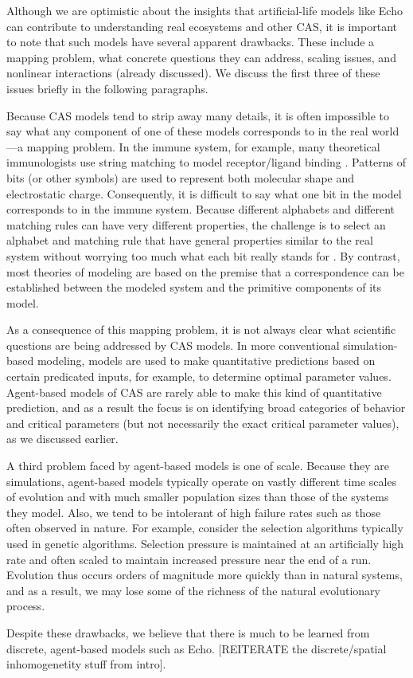 Although we are optimistic about the insights that artificial-life
models like Echo can contribute to understanding real ecosystems and
other CAS, it is important to note that such models have several
apparent drawbacks.  These include a mapping problem, what concrete
questions they can address, scaling issues, and nonlinear interactions
(already discussed).  We discuss the first three of these issues
briefly in the following paragraphs.

Because CAS models tend to strip away many details, it is often
impossible to say what any component of one of these models
corresponds to in the real world---a mapping problem.  In
the immune system, for example, many theoretical immunologists use string
matching to model receptor/ligand binding
\cite{PerelsonAndOster79}.  Patterns of bits (or other symbols) are
used to represent both molecular shape and electrostatic charge.
Consequently, it is difficult to say what one bit in the model
corresponds to in the immune system.  Because different alphabets and
different matching rules can have very different properties, the
challenge is to select an alphabet and matching rule that have general
properties similar to the real system without worrying too much what
each bit really stands for \cite{Smith94a}.  By contrast, most
theories of modeling are based on the premise that a correspondence
can be established between the modeled system and the primitive
components of its model.

As a consequence of this mapping problem, it is not always clear what
scientific questions are being addressed by CAS models.  In more
conventional simulation-based modeling, models are used to make
quantitative predictions based on certain predicated inputs, for
example, to determine optimal parameter values.  Agent-based models of
CAS are rarely able to make this kind of quantitative prediction, and
as a result the focus is on identifying broad categories of behavior
and critical parameters (but not necessarily the exact critical
parameter values), as we discussed earlier.

A third problem faced by agent-based models is one of scale.  Because
they are simulations, agent-based models typically operate on vastly
different time scales of evolution and with much smaller population
sizes than those of the systems they model.  Also, we tend to be
intolerant of high failure rates such as those often observed in
nature.  For example, consider the selection algorithms typically used
in genetic algorithms.  Selection pressure is maintained at an
artificially high rate and often scaled to maintain increased pressure
near the end of a run.  Evolution thus occurs orders of magnitude more
quickly than in natural systems, and as a result, we may lose some of
the richness of the natural evolutionary process.

Despite these drawbacks, we believe that there is much to be learned
from discrete, agent-based models such as Echo.  [REITERATE the 
discrete/spatial inhomogenetity stuff from intro].